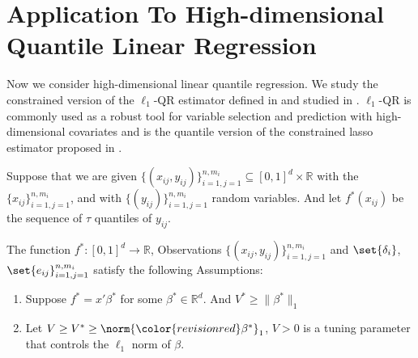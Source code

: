 \documentclass[twoside,11pt]{article}
\newcommand{\rev}[1]{{\color{revisionred}#1}}
\begin{document}

\section{Application To High-dimensional Quantile Linear Regression}


Now we consider high-dimensional linear quantile regression. We study the constrained version of the $\ell_1$-QR estimator defined in \cite{fu2000asymptotics} and studied in \cite{belloni2011}. $\ell_1$-QR is commonly used as a robust tool for variable selection and prediction with high-dimensional covariates and is the quantile version of the constrained lasso estimator proposed in \cite{tibshirani1996regression}.

Suppose that we are given $\{(x_{ij}, y_{ij})\}_{i=1,j=1}^{n,m_i} \subseteq [0, 1]^d \times \mathbb{R}$ with the $\{x_{ij}\}_{i=1,j=1}^{n,m_i}$, and with $\{( y_{ij})\}_{i=1,j=1}^{n,m_i}$ random variables.  
And let $f^*(x_{ij})$ be the sequence of $\tau$ quantiles of $y_{ij}$. 

\begin{assumption}
\label{ass_hd}
The function $f^*: [0,1]^d \to \mathbb{R}$, Observations $\{(x_{ij}, y_{ij})\}_{i=1,j=1}^{n,m_i}$ and $\set{\delta_i}$, $\set{e_{ij}}_{i=1,j=1}^{n,m_i}$ satisfy the following Assumptions:
\begin{enumerate}[label={\bfseries\arabic*.}, ref={\ref{ass_hd}.\arabic*}]
\item\label{ass_hd_2} Suppose $f^* = x'\beta^*$ for some $\beta^* \in \mathbb{R}^d$. And $V^* \geq  \|\beta^*\|_1$ 
\item\label{ass_hd_3} Let $V \geq V^* \geq \norm{\rev{\beta^*}}_1$, $V > 0$ is a tuning parameter that controls the $\ell_1$ norm of $\beta$.
\end{enumerate}
\end{assumption}
\end{document}
